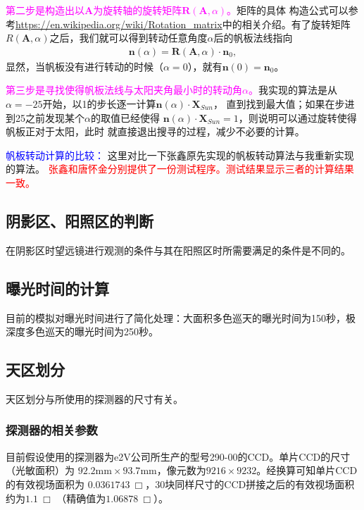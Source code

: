 \documentclass[a4paper,11pt]{ctexart}
\newcommand{\RT}[1]{\textcolor{red}{#1}}
\newcommand{\BT}[1]{\textcolor{blue}{#1}}
\newcommand{\MT}[1]{\textcolor{magenta}{#1}}
\begin{document}
\MT{\heiti 第二步是构造出以$\bm{A}$为旋转轴的旋转矩阵$\bm{R}(\bm{A},\alpha)$。}矩阵的具体
构造公式可以参考\url{https://en.wikipedia.org/wiki/Rotation_matrix}中的相关介绍。有了旋转矩阵
$R(\bm{A},\alpha)$之后，我们就可以得到转动任意角度$\alpha$后的帆板法线指向
\begin{eqnarray}
\bm{n}(\alpha) = \bm{R}(\bm{A},\alpha)\cdot\bm{n}_{0},
\end{eqnarray}
显然，当帆板没有进行转动的时候（$\alpha=0$），就有$\bm{n}(0)=\bm{n}_{0}$。

\MT{\heiti 第三步是寻找使得帆板法线与太阳夹角最小时的转动角$\alpha$。}我实现的算法是从
$\alpha=-25$\textdegree 开始，以1\textdegree 的步长逐一计算$\bm{n}(\alpha)\cdot\bm{X}_{Sun}$，
直到找到最大值；如果在步进到25\textdegree 之前发现某个$\alpha$的取值已经使得
$\bm{n}(\alpha)\cdot\bm{X}_{Sun}=1$，则说明可以通过旋转使得帆板正对于太阳，此时
就直接退出搜寻的过程，减少不必要的计算。

\BT{\heiti 帆板转动计算的比较：}
这里对比一下张鑫原先实现的帆板转动算法与我重新实现的算法。
\RT{张鑫和唐怀金分别提供了一份测试程序。测试结果显示三者的计算结果一致。}


\subsection{阴影区、阳照区的判断}
在阴影区时望远镜进行观测的条件与其在阳照区时所需要满足的条件是不同的。

\subsection{曝光时间的计算}
目前的模拟对曝光时间进行了简化处理：大面积多色巡天的曝光时间为150秒，极深度多色巡天的曝光时间为250秒。


\subsection{天区划分}

天区划分与所使用的探测器的尺寸有关。

\subsubsection{探测器的相关参数}
目前假设使用的探测器为e2V公司所生产的型号290-00的CCD。单片CCD的尺寸（光敏面积）为
$92.2\text{mm}\times93.7\text{mm}$，像元数为$9216\times 9232$。经换算可知单片CCD的有效视场面积为
$0.0361743~\Box$\textdegree，30块同样尺寸的CCD拼接之后的有效视场面积约为$1.1~\Box$\textdegree
（精确值为$1.06878~\Box$\textdegree）。
\end{document}
